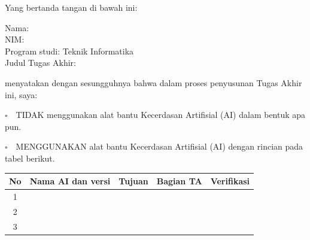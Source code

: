 

\enlargethispage{1.5\baselineskip}

\begingroup
\singlespacing
\noindent Yang bertanda tangan di bawah ini:\par
\vspace{1pt}
\noindent Nama: \placeholder{[………]}\\
NIM: \placeholder{[………]}\\
Program studi: Teknik Informatika\\
Judul Tugas Akhir: \placeholder{[………]}\par
\vspace{2pt}

\noindent menyatakan dengan sesungguhnya bahwa dalam proses penyusunan Tugas Akhir ini, saya:\par
\vspace{2pt}

\noindent $\square$\ \ TIDAK menggunakan alat bantu Kecerdasan Artifisial (AI) dalam bentuk apa pun.\par
\vspace{1pt}
\noindent $\square$\ \ MENGGUNAKAN alat bantu Kecerdasan Artifisial (AI) dengan rincian pada tabel berikut.\par
\vspace{2pt}

\begingroup\singlespacing\footnotesize\noindent
\renewcommand{\arraystretch}{0.95}
\begin{tabularx}{\textwidth}{|c|X|X|X|X|}
\hline
\rowcolor{shadeheader}\centering\textbf{No} & \centering\textbf{Nama AI dan versi} & \centering\textbf{Tujuan} & \centering\textbf{Bagian TA} & \centering\arraybackslash\textbf{Verifikasi} \\\hline
1 & & & & \\\hline
2 & & & & \\\hline
3 & & & & \\\hline
\end{tabularx}
\endgroup

